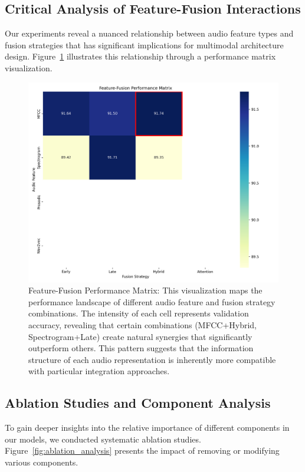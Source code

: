 \documentclass[12pt]{article}
\begin{document}
\subsection{Critical Analysis of Feature-Fusion Interactions}
Our experiments reveal a nuanced relationship between audio feature types and fusion strategies that has significant implications for multimodal architecture design. Figure~\ref{fig:feature_fusion_matrix} illustrates this relationship through a performance matrix visualization.

\begin{figure}[h]
    \centering
    \includegraphics[width=0.9\linewidth]{Figures/feature_fusion_matrix.png}
    \caption{Feature-Fusion Performance Matrix: This visualization maps the performance landscape of different audio feature and fusion strategy combinations. The intensity of each cell represents validation accuracy, revealing that certain combinations (MFCC+Hybrid, Spectrogram+Late) create natural synergies that significantly outperform others. This pattern suggests that the information structure of each audio representation is inherently more compatible with particular integration approaches.}
    \label{fig:feature_fusion_matrix}
\end{figure}

\subsection{Ablation Studies and Component Analysis}
To gain deeper insights into the relative importance of different components in our models, we conducted systematic ablation studies. Figure~\ref{fig:ablation_analysis} presents the impact of removing or modifying various components.
\end{document}
